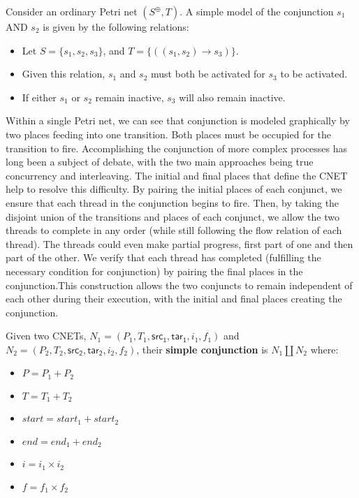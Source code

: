\begin{example}
  \label{ex:SIMP-AND-PN}
Consider an ordinary Petri net $(S^\oplus, T)$. A simple model of the conjunction $s_1$ AND $s_2$ is given by the following relations:
  \begin{itemize}
  \item Let $S = \{s_1, s_2, s_3\}$, and $T = \{((s_1, s_2) \to s_3)\}$. 
  \item Given this relation, $s_1$ and $s_2$ must both be activated for $s_3$ to be activated. 
  \item If either $s_1$ or $s_2$ remain inactive, $s_3$ will also remain inactive.  
  \end{itemize}
Within a single Petri net, we can see that conjunction is modeled graphically by two places feeding into one transition. Both places must be occupied for the transition to fire. Accomplishing the conjunction of more complex processes has long been a subject of debate, with the two main approaches being true concurrency and interleaving. The initial and final places that define the CNET help to resolve this difficulty. By pairing the initial places of each conjunct, we ensure that each thread in the conjunction begins to fire. Then, by taking the disjoint union of the transitions and places of each conjunct, we allow the two threads to complete in any order (while still following the flow relation of each thread). The threads could even make partial progress, first part of one and then part of the other. We verify that each thread has completed (fulfilling the necessary condition for conjunction) by pairing the final places in the conjunction.This construction allows the two conjuncts to remain independent of each other during their execution, with the initial and final places creating the conjunction. 
\end{example}
\begin{definition}
  \label{def:SIMP-AND-PN}
  Given two CNETs, $N_1= (P_1, T_1, \mathsf{src_1}, \mathsf{tar_1}, i_1, f_1)$ and $N_2= (P_2, T_2, \mathsf{src_2}, \mathsf{tar_2}, i_2, f_2)$, their \textbf{simple conjunction} is $N_1 \amalg N_2$ where: \\
\begin{itemize}
\item $P= P_1 + P_2$
\item $T = T_1 + T_2$
\item $start = start_1 + start_2$
\item $end = end_1 + end_2$
\item $i = i_1 \times i_2$
\item$f = f_1 \times f_2$
\end{itemize}
\end{definition}
